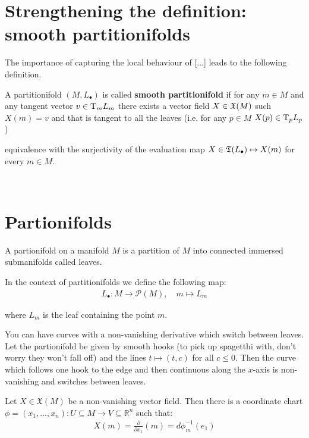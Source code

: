 \section{Strengthening the definition: smooth partitionifolds}

	The importance of {\color{Red}capturing the local behaviour of [...]} leads to the following definition.

	\begin{definition}
		A partitionifold $(M, L_\bullet)$ is called \textbf{smooth partitionifold} if for any $m \in M$ and any tangent vector $v \in \mathrm{T}_m L_m$ there exists a vector field $X \in \mathfrak{X}(M)$ such $X(m) = v$ and that is tangent to all the leaves (i.e. for any $p \in M$ $X(p) \in \mathrm{T}_p L_p$)

	\end{definition}

	\begin{remark}
		equivalence with the surjectivity of the evaluation map $X \in \mathfrak{T}(L_\bullet) \mapsto X(m)$ for every $m \in M$.
	\end{remark}

\newpage
~
\newpage


	\section{Partionifolds}
		A partionifold on a manifold $M$ is a partition of $M$ into connected immersed submanifolds called leaves. \bigskip

		In the context of partitionifolds we define the following map:
%
		\begin{align*}
			L_\bullet : M \to \mathcal{P}(M), \quad m \mapsto L_m
		\end{align*}

		where $L_m$ is the leaf containing the point $m$. \bigskip

		You can have curves with a non-vanishing derivative which switch between leaves. Let the partionifold be given by smooth hooks (to pick up spagetthi with, don't worry they won't fall off) and the lines $t \mapsto (t, c)$ for all $c \leq 0$. Then the curve which follows one hook to the edge and then continuous along the $x$-axis is non-vanishing and switches between leaves. \bigskip

		\begin{prop}
			Let $X \in \mathfrak{X}(M)$ be a non-vanishing vector field. Then there is a coordinate chart $\phi = (x_1, \ldots, x_n) : U \subseteq M \to V \subseteq \mathbb{R}^n$ such that:
			\begin{align*}
				X(m) = \frac{\partial}{\partial x_1}(m) = d \phi_m^{-1}(e_1)
			\end{align*}
		\end{prop}

